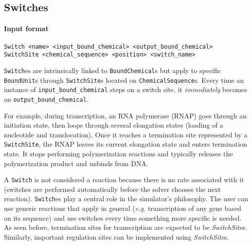 
\subsection{Switches}

\paragraph{Input format}
\begin{verbatim}
Switch <name> <input_bound_chemical> <output_bound_chemical>
SwitchSite <chemical_sequence> <position> <switch_name>
\end{verbatim}

\texttt{Switch}es are intrinsically linked to \texttt{BoundChemical}s
but apply to specific \texttt{BoundUnit}s through \texttt{SwitchSite}s
located on \texttt{ChemicalSequence}s.
Every time an instance of \texttt{input\_\allowbreak{}bound\_chemical} steps on a switch site,
it \emph{immediately} becomes an \texttt{output\_bound\_chemical}.

For example, during transcription, an RNA polymerase (RNAP) goes through an
initiation state, then loops through several elongation states
(loading of a nucleotide and translocation).
Once it reaches a termination site represented by a \texttt{SwitchSite},
the RNAP leaves its current elongation state and enters termination state.
It stops performing polymerization reactions and typically releases the polymerization product
and unbinds from DNA.\@

A \texttt{Switch} is not considered a reaction because there is no rate associated with it
(switches are performed automatically before the solver chooses the next reaction).
\texttt{Switch}es play a central role in the simulator's philosophy.
The user can use generic reactions that apply in general
(\textit{e.g.} transcription of any gene based on its sequence)
and use switches every time something more specific is needed.
As seen before, termination sites for transcription are expected to be \textit{SwitchSite}s.
Similarly, important regulation sites can be implemented using \textit{SwitchSite}s.
